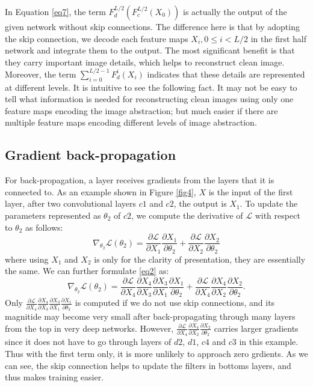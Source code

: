 In Equation \eqref{eq7}, the term $F_d^{L/2}(F_c^{L/2}(X_0))$ is actually the output
of the given network without skip connections. The difference here is that by adopting
the skip connection, we decode each feature maps $X_i, 0\leq i <L/2$ in the first half
network and integrate them to the output. The most significant benefit is that they carry
important image details, which helps to reconstruct clean image. Moreover, the term
$\sum_{i=0}^{L/2-1} F_d^i(X_i)$ indicates that these details are represented at
different levels. It is intuitive  to see the following fact. It may not be easy to tell what information
 is needed for
reconstructing clean images using only one feature maps encoding the image abstraction;
but much easier if there are multiple feature maps encoding different levels of image abstraction.



\subsection{Gradient back-propagation}

For back-propagation, a layer receives gradients from the layers that it is connected to.
As an example shown in Figure \ref{fig4}, $X$ is the input of the first layer,
after two convolutional layers $c1$ and $c2$, the output is $X_1$. To update the parameters
represented as $\theta_2$ of $c2$, we compute the derivative of $\mathcal{L}$ with
respect to $\theta_2$ as follows:
\begin{equation}
\nabla_{\theta_2}\mathcal{L}(\theta_2) = \frac{\partial\mathcal{L}}{\partial X_1}\frac{\partial X_1}{\partial\theta_2} + \frac{\partial\mathcal{L}}{\partial X_2}\frac{\partial X_2}{\partial\theta_2}
\label{eq2}
\end{equation}
where using $X_1$ and $X_2$ is only for the clarity of presentation, they are essentially
the same. We can further formulate \eqref{eq2} as:
\begin{equation}
\nabla_{\theta_2}\mathcal{L}(\theta_2) = \frac{\partial\mathcal{L}}{\partial X_4}\frac{\partial X_4}{\partial X_3}\frac{\partial X_3}{\partial X_1}\frac{\partial X_1}{\partial\theta_2} + \frac{\partial\mathcal{L}}{\partial X_4}\frac{\partial X_4}{\partial X_2}\frac{\partial X_2}{\partial\theta_2}.
\label{eq3}
\end{equation}
Only $\frac{\partial\mathcal{L}}{\partial X_4}\frac{\partial X_4}{\partial X_3}\frac{\partial X_3}{\partial X_1}\frac{\partial X_1}{\partial\theta_2}$ is computed if we do not use skip connections, and its magnitide
 may become very
small after back-propagating through many layers from the top in very deep networks.
However, $\frac{\partial\mathcal{L}}{\partial X_4}\frac{\partial X_4}{\partial X_2}\frac{\partial X_2}{\partial\theta_2}$
carries larger gradients since it does not have to go through layers of $d2$, $d1$, $c4$ and $c3$ in this example.
Thus with the first term only, it is more unlikely to approach zero grdients.
 As we can see, the skip connection helps to update
the filters in bottoms layers, and thus makes training easier.

